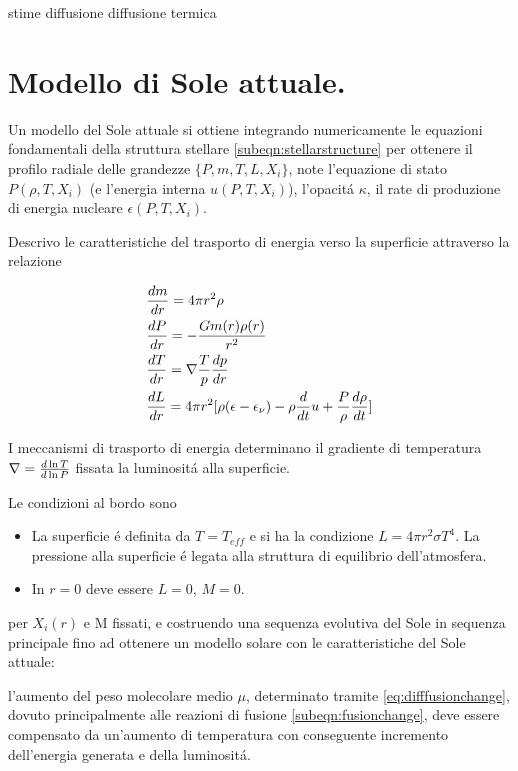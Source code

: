 \documentclass[../main.tex]{subfiles}
\begin{document}
\begingroup
\color{midnightblue}
stime diffusione
diffusione termica
\endgroup


\section{Modello di Sole attuale.}

Un modello del Sole attuale si ottiene integrando numericamente le equazioni fondamentali della struttura stellare \eqref{subeqn:stellarstructure} per ottenere il profilo radiale delle grandezze $\{P,m,T,L,X_i\}$, note  l'equazione di stato $P(\rho,T,X_i)$ (e l'energia interna $u(P,T,X_i)$), l'opacit\'a $\kappa$, il rate di produzione di energia nucleare $\epsilon(P,T,X_i)$.

Descrivo le caratteristiche del trasporto di energia verso la superficie attraverso la relazione

\begin{subequations}\label{subeqn:stellarstructure}
\begin{align}
&\TDy{r}{m}=4\pi r^2\rho\\
&\TDy{r}{P}=-\frac{Gm(r)\rho(r)}{r^2}\\
&\TDy{r}{T}=\nabla\frac{T}{p}\TDy{r}{p}\\
&\TDy{r}{L}=4\pi r^2[\rho(\epsilon-\epsilon_{\nu})-\rho\TDof{t}u+\frac{P}{\rho}\TDy{t}{\rho}]
\end{align}
\end{subequations}

I meccanismi di trasporto di energia determinano il gradiente di temperatura $\nabla=\TDly{P}{T}$ fissata la luminosit\'a alla superficie.

Le condizioni al bordo sono
\begin{itemize}
    \item La superficie \'e definita da $T=T_{eff}$ e si ha la condizione $L=4\pi r^2\sigma T^4$. La pressione alla superficie \'e legata alla struttura di equilibrio dell'atmosfera.
    \item In $r=0$ deve essere $L=0$, $M=0$.
\end{itemize}
per $X_i(r)$ e M fissati, e costruendo una sequenza evolutiva del Sole in sequenza principale fino ad ottenere un modello solare con le caratteristiche del Sole attuale:

l'aumento del peso molecolare medio $\mu$, determinato tramite \eqref{eq:difffusionchange}, dovuto principalmente alle reazioni di fusione \eqref{subeqn:fusionchange}, deve essere compensato da un'aumento di temperatura con conseguente incremento dell'energia generata e della luminosit\'a.
\end{document}
